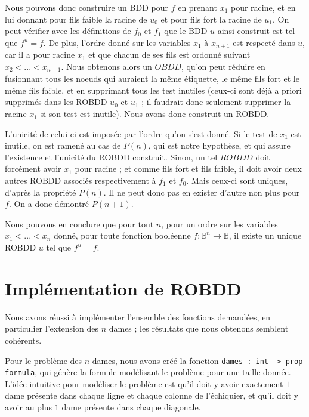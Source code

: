 \documentclass[a4paper,11pt]{article}
\begin{document}
\begin{itemize}
		Nous pouvons donc construire un BDD pour $f$ en prenant $x_1$ pour racine, et en lui donnant pour fils faible la racine de $u_0$ et pour fils fort la racine de $u_1$. On peut vérifier avec les définitions de $f_0$ et $f_1$ que le BDD $u$ ainsi construit est tel que $f^u = f$. De plus, l'ordre donné sur les variables $x_1$ à $x_{n+1}$ est respecté dans $u$, car il a pour racine $x_1$ et que chacun de ses fils est ordonné suivant $x_2 < ... < x_{n+1}$. Nous obtenons alors un $OBDD$, qu'on peut réduire en fusionnant tous les noeuds qui auraient la même étiquette, le même fils fort et le même fils faible, et en supprimant tous les test inutiles (ceux-ci sont déjà a priori supprimés dans les ROBDD $u_0$ et $u_1$ ; il faudrait donc seulement supprimer la racine $x_1$ si son test est inutile). Nous avons donc construit un ROBDD. 

L'unicité de celui-ci est imposée par l'ordre qu'on s'est donné. Si le test de $x_1$ est inutile, on est ramené au cas de $P(n)$, qui est notre hypothèse, et qui assure l'existence et l'unicité du ROBDD construit. Sinon, un tel $ROBDD$ doit forcément avoir $x_1$ pour racine ; et comme fils fort et fils faible, il doit avoir deux autres ROBDD associés respectivement à $f_1$ et $f_0$. Mais ceux-ci sont uniques, d'après la propriété $P(n)$. Il ne peut donc pas en exister d'autre non plus pour $f$. On a donc démontré $P(n+1)$.
		\end{itemize}
		
Nous pouvons en conclure que pour tout $n$, pour un ordre sur les variables $x_1 < ... < x_n$ donné, pour toute fonction booléenne $f : \mathbb{B}^n \rightarrow \mathbb{B}$, il existe un unique ROBDD $u$ tel que $f^u = f$.
		
	\section{Implémentation de ROBDD}
	
	Nous avons réussi à implémenter l'ensemble des fonctions demandées, en particulier l'extension des $n$ dames ; les résultats que nous obtenons semblent cohérents.
	
	Pour le problème des $n$ dames, nous avons créé la fonction \texttt{dames : int -> prop formula}, qui génère la formule modélisant le problème pour une taille donnée. L'idée intuitive pour modéliser le problème est qu'il doit y avoir exactement $1$ dame présente dans chaque ligne et chaque colonne de l'échiquier, et qu'il doit y avoir au plus $1$ dame présente dans chaque diagonale. 
	
\end{document}
